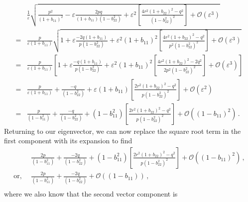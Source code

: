 {\small
\begin{align*}
& \frac{1}{\varepsilon}\sqrt{\frac{p^2}{(1+b_{11})^2}-\varepsilon\frac{2pq}{(1+b_{11})(1-b_{22}^2)}+\varepsilon^2\left[ \frac{4r^2(1+ b_{22})^2 -  q^2 }{(1-b_{22}^2)^2} \right] + \mathcal{O}(\varepsilon^3)}\\
= & \frac{p}{\varepsilon (1+b_{11})} \sqrt{1+\varepsilon\frac{-2q(1+b_{11})}{p(1-b_{22}^2)}+\varepsilon^2(1+b_{11})^2\left[ \frac{4r^2(1+ b_{22})^2 -  q^2 }{p^2(1-b_{22}^2)^2} \right] + \mathcal{O}(\varepsilon^3)}\\
=& \frac{p}{\varepsilon (1+b_{11})}\left[1+
\varepsilon\frac{-q(1+b_{11})}{p(1-b_{22}^2)}+
\varepsilon^2(1+b_{11})^2 \left[ \frac{4r^2(1+ b_{22})^2 -  2q^2 }{2p^2(1-b_{22}^2)^2}\right]
+ \mathcal{O}(\varepsilon^3)
\right]\\
=&
\frac{p}{\varepsilon (1+b_{11})} + 
\frac{-q}{(1-b_{22}^2)}+
\varepsilon(1+b_{11}) \left[ \frac{2r^2(1+ b_{22})^2 -  q^2 }{p(1-b_{22}^2)^2}\right]
+ \mathcal{O}(\varepsilon^2)\\
=&
\frac{p}{(1-b_{11}^2)} + 
\frac{-q}{(1-b_{22}^2)}+
(1-b_{11}^2) \left[ \frac{2r^2(1+ b_{22})^2 -  q^2 }{p(1-b_{22}^2)^2}\right]
+ \mathcal{O}((1-b_{11})^2)\,.
\end{align*}
}
Returning to our eigenvector, we can now replace the square root term in the first component with its expansion to find
\begin{align*}
& \frac{2p}{(1-b_{11}^2)} + 
\frac{-2q}{(1-b_{22}^2)}+
(1-b_{11}^2) \left[ \frac{2r^2(1+ b_{22})^2 -  q^2 }{p(1-b_{22}^2)^2}\right]
+ \mathcal{O}((1-b_{11})^2)\,,\\
\text{or, }~& \frac{2p}{(1-b_{11}^2)} + 
\frac{-2q}{(1-b_{22}^2)}
+ \mathcal{O}((1-b_{11}))\,,\\
\end{align*} 
where we also know that the second vector component is
